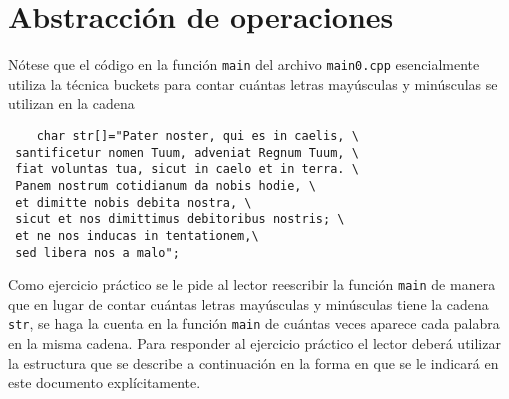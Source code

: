 \documentclass[12pt]{article}
\begin{document}
\section*{Abstracci\'{o}n de operaciones}
N\'{o}tese que el c\'{o}digo en la funci\'{o}n {\tt main} del archivo {\tt main0.cpp} 
esencialmente utiliza la t\'{e}cnica buckets para contar cu\'{a}ntas letras may\'{u}sculas y 
min\'{u}sculas se utilizan en la cadena
\begin{verbatim}
    char str[]="Pater noster, qui es in caelis, \
 santificetur nomen Tuum, adveniat Regnum Tuum, \
 fiat voluntas tua, sicut in caelo et in terra. \
 Panem nostrum cotidianum da nobis hodie, \
 et dimitte nobis debita nostra, \
 sicut et nos dimittimus debitoribus nostris; \
 et ne nos inducas in tentationem,\
 sed libera nos a malo";
\end{verbatim}
Como ejercicio pr\'{a}ctico se le pide al lector reescribir la funci\'{o}n {\tt main} de ma\-ne\-ra 
que en lugar de contar cu\'{a}ntas letras may\'{u}sculas y min\'{u}sculas tiene la cadena {\tt str}, 
se haga la cuenta en la funci\'{o}n {\tt main} de cu\'{a}ntas veces aparece cada palabra en la misma 
cadena. Para responder al ejercicio pr\'{a}ctico el lector deber\'{a} utilizar la estructura que 
se describe a continuaci\'{o}n en la forma en que se le indicar\'{a} en este documento 
expl\'{i}citamente.
\end{document}
